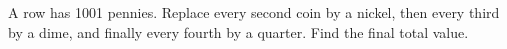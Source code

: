 A row has 1001 pennies. Replace every second coin by a nickel, then every third by a dime, and finally every fourth by a quarter. Find the final total value.
